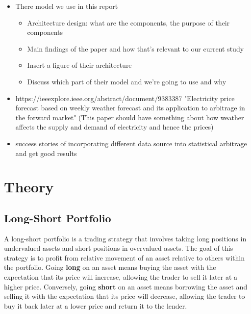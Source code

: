 \documentclass[12pt]{article}
\begin{document}
\begin{itemize}
    \item There model we use in this report
        \begin{itemize}
            \item Architecture design: what are the components, the purpose of their components 
            \item Main findings of the paper and how that's relevant to our current study 
            \item Insert a figure of their architecture
            \item Discuss which part of their model and we're going to use and why
        \end{itemize}
    \item https://ieeexplore.ieee.org/abstract/document/9383387
"Electricity price forecast based on weekly weather forecast and its application to arbitrage in the forward market" (This paper should have something about how weather affects the supply and demand of electricity and hence the prices)
    \item success stories of incorporating different data source into statistical arbitrage and get good results 
\end{itemize}



\clearpage




\section{Theory}

\subsection{Long-Short Portfolio}
A long-short portfolio is a trading strategy that involves taking long positions in undervalued assets and short positions in overvalued assets. The goal of this strategy is to profit from relative movement of an asset relative to others within the portfolio. 
Going \textbf{long} on an asset means buying the asset with the expectation that its price will increase, allowing the trader to sell it later at a higher price. Conversely, going \textbf{short} on an asset means borrowing the asset and selling it with the expectation that its price will decrease, allowing the trader to buy it back later at a lower price and return it to the lender.
\end{document}
